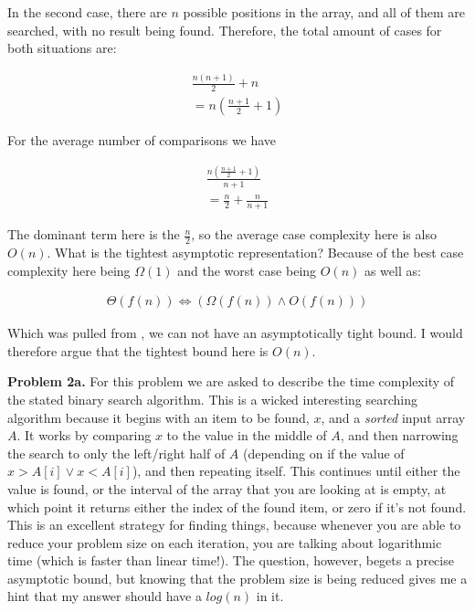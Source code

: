 \documentclass{article}
\begin{document}
In the second case, there are $n$ possible positions in the array, and all of them are searched, with no result being found. Therefore, the total amount of cases for both situations are:

\begin{gather}
    \frac{n(n+1)}{2} + n \\
    = n(\frac{n+1}{2}+1)
\end{gather}

For the average number of comparisons we have 

\begin{gather}
    \frac{n(\frac{n+1}{2}+1)}{n+1} \\
    = \frac{n}{2} + \frac{n}{n+1}
\end{gather}

The dominant term here is the $\frac{n}{2}$, so the average case complexity here is also $O(n)$. What is the tightest asymptotic representation? Because of the best case complexity here being $\Omega(1)$ and the worst case being $O(n)$ as well as:

\begin{gather}
    \Theta(f(n)) \Leftrightarrow (\Omega(f(n)) \land O(f(n)))
\end{gather}

Which was pulled from \cite{website:1}, we can not have an asymptotically tight bound. I would therefore argue that the tightest bound here is $O(n)$.


\hfill

\textbf{Problem 2a.} For this problem we are asked to describe the time complexity of the stated binary search algorithm. This is a wicked interesting searching algorithm because it begins with an item to be found, $x$, and a \emph{sorted} input array $A$. It works by comparing $x$ to the value in the middle of $A$, and then narrowing the search to only the left/right half of $A$ (depending on if the value of $x > A[i] \lor x < A[i]$), and then repeating itself. This continues until either the value is found, or the interval of the array that you are looking at is empty, at which point it returns either the index of the found item, or zero if it's not found. This is an excellent strategy for finding things, because whenever you are able to reduce your problem size on each iteration, you are talking about logarithmic time (which is faster than linear time!). The question, however, begets a precise asymptotic bound, but knowing that the problem size is being reduced gives me a hint that my answer should have a $log(n)$ in it.
\end{document}
